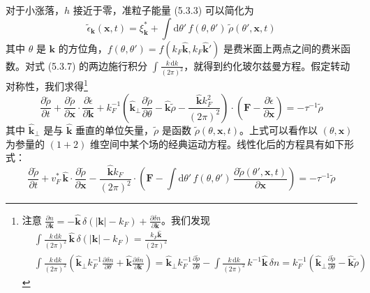 对于小涨落，$h$ 接近于零，准粒子能量 (5.3.3) 可以简化为
\begin{equation*}
\tilde{\epsilon}_{\pmb{k}}(\pmb{x},t) = \xi^{*}_{\pmb{k}} + \int \mathrm{d}\theta'\, f(\theta,\theta')\, \tilde{\rho}(\theta',\pmb{x},t) \tag{5.3.8}
\end{equation*}
其中 $\theta$ 是 $\pmb{k}$ 的方位角，$f(\theta,\theta') = f(k_F\hat{\pmb{k}}, k_F\hat{\pmb{k}}')$ 是费米面上两点之间的费米函数。对式 (5.3.7) 的两边施行积分 $\int \frac{k\,\mathrm{d}k}{(2\pi)^{2}}$，就得到约化玻尔兹曼方程。假定转动对称性，我们求得\footnote{注意 $\frac{\partial n}{\partial \pmb{k}} = -\hat{\pmb{k}}\,\delta(|\pmb{k}| - k_F) + \frac{\partial \delta n}{\partial \pmb{k}}$。我们发现
\begin{align*}
&\int \frac{k\,\mathrm{d}k}{(2\pi)^{2}}\, \hat{\pmb{k}}\, \delta(|\pmb{k}| - k_F) = \frac{k_F \hat{\pmb{k}}}{(2\pi)^{2}}\\
&\int \frac{k\,\mathrm{d}k}{(2\pi)^{2}} \left( \hat{\pmb{k}}_{\perp} k_F^{-1} \frac{\partial \delta n}{\partial \theta} + \hat{\pmb{k}} \frac{\partial \delta n}{\partial \pmb{k}} \right) = \hat{\pmb{k}}_{\perp} k_F^{-1} \frac{\partial \tilde{\rho}}{\partial \theta} - \int \frac{k\,\mathrm{d}k}{(2\pi)^{2}}\, k^{-1} \hat{\pmb{k}}\, \delta n = k_F^{-1} \left( \hat{\pmb{k}}_{\perp} \frac{\partial \tilde{\rho}}{\partial \theta} - \hat{\pmb{k}}\tilde{\rho} \right)
\end{align*}}
\begin{equation*}
\frac{\partial \tilde{\rho}}{\partial t} + \frac{\partial \tilde{\rho}}{\partial \pmb{x}} \cdot \frac{\partial \tilde{\epsilon}}{\partial \pmb{k}} + k_F^{-1} \left( \hat{\pmb{k}}_{\perp} \frac{\partial \tilde{\rho}}{\partial \theta} - \hat{\pmb{k}}\tilde{\rho} - \frac{\hat{\pmb{k}} k_F^{2}}{(2\pi)^{2}} \right) \cdot \left( \pmb{F} - \frac{\partial \tilde{\epsilon}}{\partial \pmb{x}} \right) = -\tau^{-1} \tilde{\rho} \tag{5.3.9}
\end{equation*}
其中 $\hat{\pmb{k}}_{\perp}$ 是与 $\hat{\pmb{k}}$ 垂直的单位矢量，$\tilde{\rho}$ 是函数 $\tilde{\rho}(\theta,\pmb{x},t)$。上式可以看作以 $(\theta,\pmb{x})$ 为参量的 $(1+2)$ 维空间中某个场的经典运动方程。线性化后的方程具有如下形式：
\begin{equation*}
\frac{\partial \tilde{\rho}}{\partial t} + v^{*}_F\, \hat{\pmb{k}} \cdot \frac{\partial \tilde{\rho}}{\partial \pmb{x}} - \frac{\hat{\pmb{k}} k_F}{(2\pi)^{2}} \cdot \left( \pmb{F} - \int \mathrm{d}\theta'\, f(\theta,\theta')\, \frac{\partial \tilde{\rho}(\theta',\pmb{x},t)}{\partial \pmb{x}} \right) = -\tau^{-1} \tilde{\rho} \tag{5.3.10}
\end{equation*}

